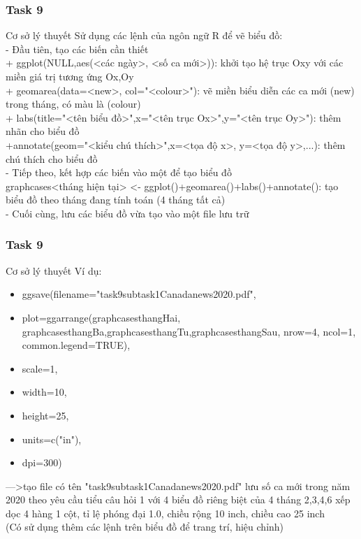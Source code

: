 \documentclass[english,10pt,table]{beamer}
\begin{document}
\frame
{
    \frametitle{Task 9}
    \begin{block}{Cơ sở lý thuyết}
	Sử dụng các lệnh của ngôn ngữ R để vẽ biểu đồ:\\
	- Đầu tiên, tạo các biến cần thiết\\
	+ ggplot(NULL,aes(<các ngày>, <số ca mới>)): khởi tạo hệ trục Oxy với các miền giá trị tương ứng Ox,Oy\\
	+ geomarea(data=<new>, col="<colour>"): vẽ miền biểu diễn các ca mới (new) trong tháng, có màu là (colour)\\
	+ labs(title="<tên biểu đồ>",x="<tên trục Ox>",y="<tên trục Oy>"): thêm nhãn cho biểu đồ\\
	+annotate(geom="<kiểu chú thích>",x=<tọa độ x>, y=<tọa độ y>,...): thêm chú thích cho biểu đồ\\
		
	- Tiếp theo, kết hợp các biến vào một để tạo biểu đồ\\
	graphcases<tháng hiện tại> <- ggplot()+geomarea()+labs()+annotate(): tạo biểu đồ theo tháng đang tính toán (4 tháng tất cả)\\
		
	- Cuối cùng, lưu các biểu đồ vừa tạo vào một file lưu trữ\\
    \end{block}
}
\frame
{
    \frametitle{Task 9}
    \begin{block}{Cơ sở lý thuyết}
	Ví dụ:\\
	\begin{itemize}
	    \item ggsave(filename="task9subtask1Canadanews2020.pdf",\\
		\item plot=ggarrange(graphcasesthangHai, graphcasesthangBa,graphcasesthangTu,graphcasesthangSau, nrow=4, ncol=1, common.legend=TRUE),\\
        \item scale=1,\\
        \item width=10,\\
        \item height=25,\\
        \item units=c("in"),\\
        \item dpi=300)\\
	\end{itemize}
    --->tạo file có tên "task9subtask1Canadanews2020.pdf" lưu số ca mới trong năm 2020 theo yêu cầu tiểu câu hỏi 1 với 4 biểu đồ riêng biệt của 4 tháng 2,3,4,6 xếp dọc 4 hàng 1 cột, tỉ lệ phóng đại 1.0, chiều rộng 10 inch, chiều cao 25 inch\\
        
    (Có sử dụng thêm các lệnh trên biểu đồ để trang trí, hiệu chỉnh)
    \end{block}
}
\end{document}
